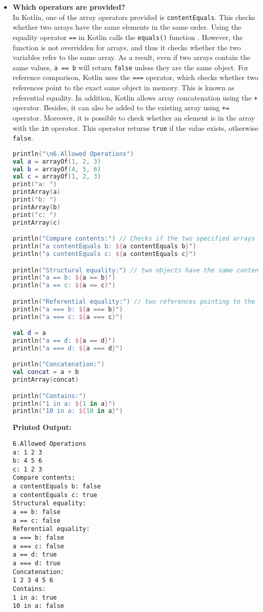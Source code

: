 \documentclass{article}
\begin{document}
\begin{itemize}
\item \textbf{Which operators are provided?} \\
In Kotlin, one of the array operators provided is \texttt{contentEquals}. This checks whether two arrays have the same elements in the same order. Using the equality operator \texttt{==} in Kotlin calls the \texttt{equals()} function \cite{kotlindocs}. However, the function is not overridden for arrays, and thus it checks whether the two variables refer to the same array. As a result, even if two arrays contain the same values, \texttt{a == b} will return \texttt{false} unless they are the same object. For reference comparison, Kotlin uses the \texttt{===} operator, which checks whether two references point to the exact same object in memory. This is known as referential equality.
In addition, Kotlin allows array concatenation using the \texttt{+} operator. Besides, it can also be added to the existing array using \texttt{+=} operator.
Moreover, it is possible to check whether an element is in the array with the \texttt{in} operator. This operator returns \texttt{true} if the value exists, otherwise \texttt{false}.

\begin{lstlisting}[language=Kotlin]
println("\n6.Allowed Operations")
val a = arrayOf(1, 2, 3)
val b = arrayOf(4, 5, 6)
val c = arrayOf(1, 2, 3)
print("a: ")
printArray(a)
print("b: ")
printArray(b)
print("c: ")
printArray(c)

println("Compare contents:") // Checks if the two specified arrays are structurally equal to one another.
println("a contentEquals b: ${a contentEquals b}") 
println("a contentEquals c: ${a contentEquals c}") 

println("Structural equality:") // two objects have the same content or structure, but for arrays: assigned variables point to the same object.
println("a == b: ${a == b}") 
println("a == c: ${a == c}")

println("Referential equality:") // two references pointing to the same object
println("a === b: ${a === b}") 
println("a === c: ${a === c}")

val d = a
println("a == d: ${a == d}")
println("a === d: ${a === d}") 

println("Concatenation:")
val concat = a + b
printArray(concat)

println("Contains:")
println("1 in a: ${1 in a}")
println("10 in a: ${10 in a}") 
\end{lstlisting}
\textbf{Printed Output:}
\begin{verbatim}
6.Allowed Operations
a: 1 2 3 
b: 4 5 6 
c: 1 2 3 
Compare contents:
a contentEquals b: false
a contentEquals c: true
Structural equality:
a == b: false
a == c: false
Referential equality:
a === b: false
a === c: false
a == d: true
a === d: true
Concatenation:
1 2 3 4 5 6 
Contains:
1 in a: true
10 in a: false
\end{verbatim}
\end{itemize}
\newpage
\end{document}
